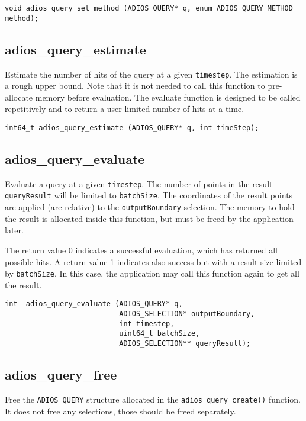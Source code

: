 \begin{lstlisting}[alsolanguage=C]
void adios_query_set_method (ADIOS_QUERY* q, enum ADIOS_QUERY_METHOD method);
\end{lstlisting}

\subsection{adios\_query\_estimate}
Estimate the number of hits of the query at a given \verb+timestep+. The estimation is a rough upper bound. Note that it is not needed to call this function to pre-allocate memory before evaluation. The evaluate function is designed to be called repetitively and to return a user-limited number of hits at a time.

\begin{lstlisting}[alsolanguage=C]
int64_t adios_query_estimate (ADIOS_QUERY* q, int timeStep);
\end{lstlisting}

\subsection{adios\_query\_evaluate}
Evaluate a query at a given \verb+timestep+. The number of points in the result \verb+queryResult+ will be limited to \verb+batchSize+. The coordinates of the result points are applied (are relative) to the \verb+outputBoundary+ selection. The memory to hold the result is allocated inside this function, but must be freed by the application later. 

The return value 0 indicates a successful evaluation, which has returned all possible hits. A return value 1 indicates also success but with a result size limited by \verb+batchSize+. In this case, the application may call this function again  to get all the result.
 
\begin{lstlisting}[alsolanguage=C]
int  adios_query_evaluate (ADIOS_QUERY* q,
                           ADIOS_SELECTION* outputBoundary,
                           int timestep,
                           uint64_t batchSize,
                           ADIOS_SELECTION** queryResult);
\end{lstlisting}

\subsection{adios\_query\_free}
Free the \verb+ADIOS_QUERY+ structure allocated in the \verb+adios_query_create()+ function. It does not free any selections, those should be freed separately.

